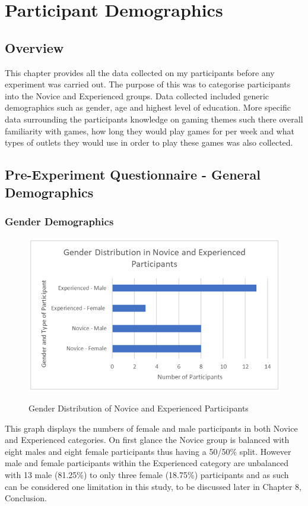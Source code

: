 \chapter{Participant Demographics}
\section{Overview}
This chapter provides all the data collected on my participants before any experiment was carried out. The purpose of this was to categorise participants into the Novice and Experienced groups. Data collected included generic demographics such as gender, age and highest level of education. More specific data surrounding the participants knowledge on gaming themes such there overall familiarity with games, how long they would play games for per week and what types of outlets they would use in order to play these games was also collected. 

\section{Pre-Experiment Questionnaire - General Demographics}
\subsection{Gender Demographics}
\begin{figure}[H]
\includegraphics[width=\linewidth]{Screenshots/DemographicsQuestionaires/genderDistribution.png}
\label{GenderDistribution}
\caption{Gender Distribution of Novice and Experienced Participants}
\end{figure}

This graph displays the numbers of female and male participants in both Novice and Experienced categories. On first glance the Novice group is balanced with eight males and eight female participants thus having a 50/50\% split. However male and female participants within the Experienced category are unbalanced with 13 male (81.25\%) to only three female (18.75\%) participants and as such can be considered one limitation in this study, to be discussed later in Chapter 8, Conclusion.  


